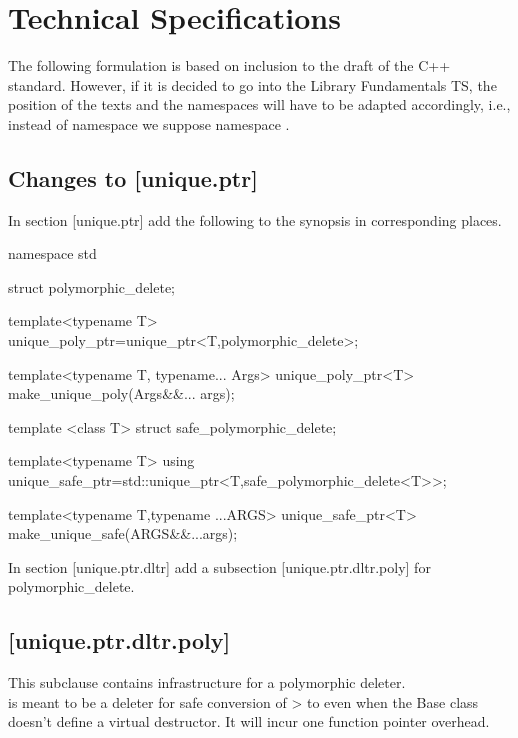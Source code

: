 \documentclass[ebook,11pt,article]{memoir}
\begin{document}
\chapter{Technical Specifications}
The following formulation is based on inclusion to the draft of the C++ standard. However, if it is decided to go into the Library Fundamentals TS, the position of the texts and the namespaces will have to be adapted accordingly, i.e., instead of namespace  we suppose namespace .

\section{Changes to [unique.ptr] }
In section [unique.ptr] add the following to the  synopsis in corresponding places.

\begin{codeblock}
namespace std{

struct polymorphic_delete;

template<typename T>
unique_poly_ptr=unique_ptr<T,polymorphic_delete>;

template<typename T, typename... Args>
unique_poly_ptr<T> make_unique_poly(Args&&... args);

template <class T>
struct  safe_polymorphic_delete;

template<typename T>
using unique_safe_ptr=std::unique_ptr<T,safe_polymorphic_delete<T>>;

template<typename T,typename ...ARGS>
unique_safe_ptr<T> make_unique_safe(ARGS&&...args);

}
\end{codeblock}

In section [unique.ptr.dltr] add a subsection [unique.ptr.dltr.poly] for polymorphic_delete.

\section{ [unique.ptr.dltr.poly]}
\pnum
This subclause contains infrastructure for a polymorphic deleter.\\

\pnum
\enternote
{} is meant to be a deleter for safe conversion of > to  even when the Base class doesn't define a virtual destructor. It will incur one function pointer overhead.
\exitnote
\end{document}
